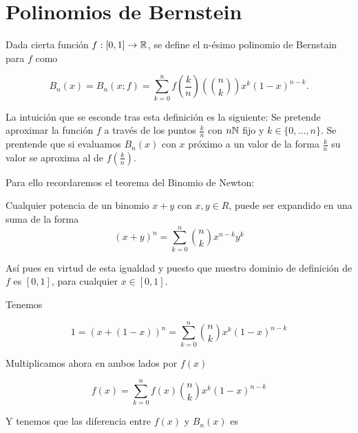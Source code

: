 %

\chapter{Polinomios de Bernstein}\label{ch:Bernstein}

\begin{definition} \label{def:Bernstein}
    Dada cierta función $f: [0,1] \rightarrow \mathbb{R}$, se define el n-ésimo polinomio de Bernstain para $f$ como 

    $$B_n(x) = B_n(x;f)=\sum_ {k=0}^{n} f \left( \frac{k}{n} \right) \left( \binom{n}{k} \right) x^k (1-x)^{n-k}.$$

\end{definition}

La intuición que se esconde tras esta definición es la siguiente: 
Se pretende aproximar la función $f$ a través de los puntos $\frac{k}{n}$ con $n \mathbb{N}$ fijo
y $k \in \{0,...,n \}.$
Se prentende que si evaluamos $B_n(x)$ con $x$ próximo a un valor de la forma $\frac{k}{n}$  
su valor se aproxima al de $f \left( \frac{k}{n} \right).$

Para ello recordaremos el teorema del Binomio de Newton: 

\begin{theorem}
    Cualquier potencia de un binomio $x+y$ con $x,y \in R$,  puede ser expandido en una suma de la forma
    \[(x+y)^n = \sum_{k=0}^n \binom{n}{k} x^{n-k}y^k\]
\end{theorem}

Así pues en virtud de esta igualdad y puesto que nuestro dominio de definición de $f$ es $[0,1]$, para cualquier $x \in [0,1].$

Tenemos 

\begin{equation}
    1 = (x+ (1-x))^n = \sum_{k=0}^n \binom{n}{k} x^{k} (1-x)^{n-k}
\end{equation}

Multiplicamos ahora en ambos lados por $f(x)$

\begin{equation}
    f(x) = \sum_{k=0}^n f(x) \binom{n}{k} x^{k} (1-x)^{n-k}
\end{equation} 

Y tenemos que las diferencia entre $f(x)$ y $B_n(x)$ es

